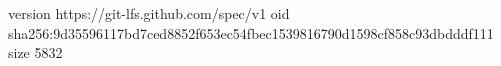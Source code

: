 version https://git-lfs.github.com/spec/v1
oid sha256:9d35596117bd7ced8852f653ec54fbec1539816790d1598cf858c93dbdddf111
size 5832
